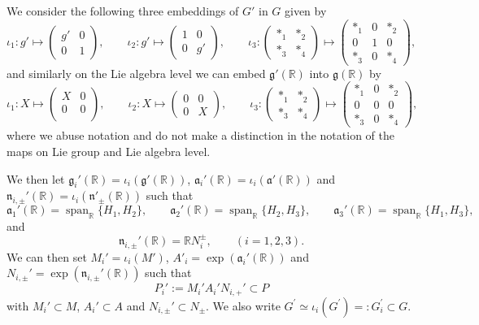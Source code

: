 \documentclass[a4paper,11pt,reqno]{amsart}
\newcommand{\fraka}{\mathfrak{a}}
\newcommand{\frakg}{\mathfrak{g}}
\newcommand{\frakn}{\mathfrak{n}}
\newcommand{\RR}{\mathbb{R}}
\newcommand{\0}{{\bf 0}}
\newcommand{\1}{{\bf 1}}
\DeclareMathOperator{\Span}{span}
\theoremstyle{plain}
\theoremstyle{definition}
\numberwithin{equation}{section}
\theoremstyle{definition}
\begin{document}
We consider the following three embeddings of $G'$ in $G$ given by
\begin{equation}\label{eqn:embedding}
\iota_1: g'\mapsto \begin{pmatrix}
    g' & 0\\
     0& 1
\end{pmatrix},\qquad
\iota_2: g'\mapsto \begin{pmatrix}
    1 &0 \\
    0& g'
\end{pmatrix},\qquad
\iota_3:\begin{pmatrix}
    *_1 & *_2\\
    *_3 & *_4
\end{pmatrix}\mapsto \begin{pmatrix}
    *_1 & 0 & *_2\\
    0 & 1 & 0\\
    *_3 & 0 & *_4
\end{pmatrix},
\end{equation}
and similarly on the Lie algebra level we can embed $\frakg'(\RR)$ into $\frakg(\RR)$ by
\begin{equation}\label{eqn:embedding2}
\iota_1:X\mapsto \begin{pmatrix}
    X &0 \\
    0&0 \\
\end{pmatrix},\qquad \iota_2:X\mapsto \begin{pmatrix}
    0 & 0\\
    0 & X
\end{pmatrix},\qquad \iota_3:\begin{pmatrix}
    *_1 & *_2\\
    *_3 & *_4
\end{pmatrix}\mapsto \begin{pmatrix}
    *_1 & 0 & *_2\\
    0 & 0 & 0\\
    *_3 & 0 & *_4
\end{pmatrix},
\end{equation}
where we abuse notation and do not make a distinction in the notation of the maps on Lie group and Lie algebra level. 

We then let $\frakg_i'(\RR)=\iota_i(\frakg'(\RR))$,  $\fraka_i'(\RR)=\iota_i(\fraka'(\RR))$ and 
$\frakn_{i,\pm}'(\RR)=\iota_i(\frakn'_\pm(\RR))$ such that 
\[
\fraka_1'(\RR)=\Span_\RR\{H_1,H_2\},\qquad \fraka_2'(\RR)=\Span_\RR\{H_2,H_3\},\qquad \fraka_3'(\RR)=\Span_\RR\{H_1,H_3\},
\]
and
\[
\frakn_{i,\pm}'(\RR)=\RR N_i^{\pm},\qquad (i=1,2,3).
\]
We can then set $M_i'=\iota_i(M')$, $A'_i=\exp(\fraka_i'(\RR))$ and $N_{i,\pm}'=\exp(\frakn_{i,\pm}'(\RR))$ such that 
\[
P_i':=M_i'A_i'N_{i,+}'\subset P
\]
with $M_i'\subset M$, $A_i'\subset A$ and $N_{i,\pm}'\subset N_{\pm}$. We also write $G^\prime\simeq  \iota_i(G^\prime)=: G^\prime_i\subset G$.
\end{document}
